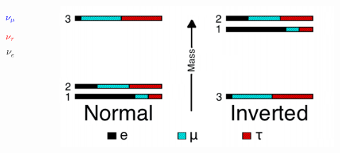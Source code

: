 \documentclass[10pt,professionalfonts,xcolor=table]{beamer}
\begin{document}
{\begin{columns}[c]
  \begin{equation*}
  \color{blue}
  \nu_\mu
  \end{equation*}
  \vspace{-20pt}
  \begin{equation*}
  \color{red}
  \nu_\tau
  \end{equation*}
  \vspace{-17pt}
  \begin{equation*}
  \nu_e
  \end{equation*}
  \gap
  ~

\centering
 \begin{figure} \includegraphics[width=\textwidth]{figures/figures/hierarchy.jpg} \end{figure}
 \vspace{8pt}
\end{columns}
}


\begin{frame}
\end{frame}
\end{document}
